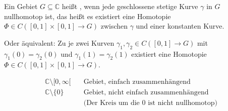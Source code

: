 \begin{theorem}[Definition]
  Ein Gebiet $G \subseteq \mathbb{C}$ heißt , wenn jede geschlossene stetige Kurve $\gamma$ in $G$ nullhomotop ist, das heißt es existiert eine Homotopie $\Phi \in C([0,1] \times [0,1] \to G)$ zwischen $\gamma$ und einer konstanten Kurve.
  
  Oder äquivalent: Zu je zwei Kurven $\gamma_1,\gamma_2 \in C([0,1] \to G)$ mit $\gamma_1(0) = \gamma_2(0)$ und $\gamma_1(1) = \gamma_2(1)$ existiert eine Homotopie $\Phi \in C([0,1] \times [0,1] \to G)$.
\end{theorem}

\begin{example*}
  \begin{align*}
    \mathbb{C} \setminus [0,\infty[ \quad &\text{Gebiet, einfach zusammenhängend}\\
    \mathbb{C} \setminus \{0\} \quad  & \text{Gebiet, nicht einfach zusammenhängend} \\
    & \text{(Der Kreis um die $0$ ist nicht nullhomotop)}
  \end{align*}
\end{example*}


